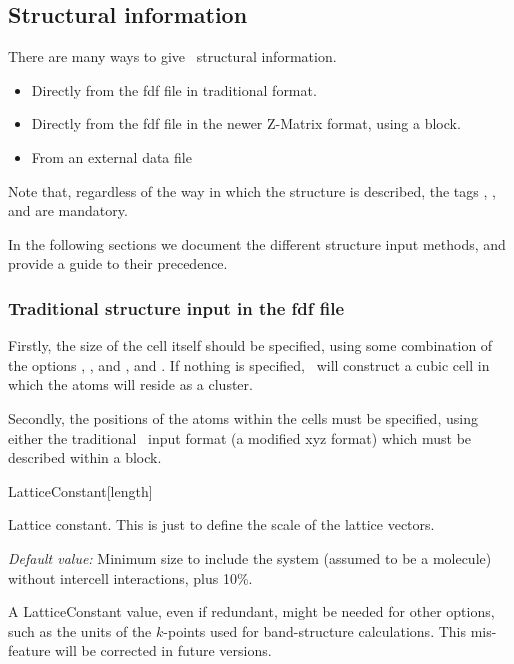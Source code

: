 \subsection{Structural information}

There are many ways to give \siesta\ structural information.

\begin{itemize}
  \item%
  Directly from the fdf file in traditional format.

  \item%
  Directly from the fdf file in the newer Z-Matrix format, using
  a  block.

  \item%
  From an external data file
\end{itemize}

Note that, regardless of the way in which the structure is described,
the tags , , and
 are mandatory.

In the following sections we document the different structure input
methods, and provide a guide to their precedence.

\subsubsection{Traditional structure input in the fdf file}

Firstly, the size of the cell itself should be specified, using some
combination of the options ,
, and , and
.  If nothing is specified, \siesta\ will construct a
cubic cell in which the atoms will reside as a cluster.

Secondly, the positions of the atoms within the cells must be
specified, using either the traditional \siesta\ input format (a
modified xyz format) which must be described within a
 block.

\begin{fdfentry}{LatticeConstant}[length]

  Lattice constant. This is just to define the scale of the lattice
  vectors.

  \textit{Default value:} Minimum size to include the system (assumed
  to be a molecule) without intercell interactions, plus 10\%.

  \note A LatticeConstant value, even if redundant, might be needed
  for other options, such as the units of the $k$-points used for
  band-structure calculations. This mis-feature will be corrected in
  future versions.
  
\end{fdfentry}

